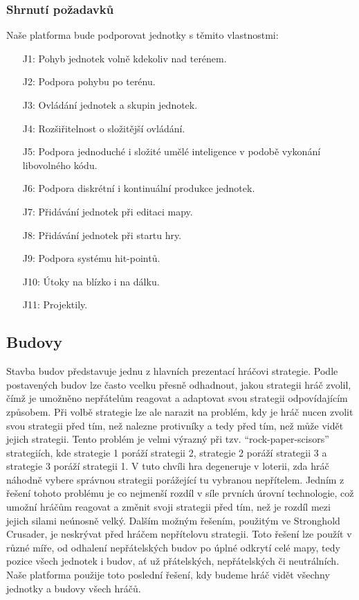 \subsubsection{Shrnutí požadavků}
Naše platforma bude podporovat jednotky s těmito vlastnostmi:
\begin{itemize}
	\item[J1:] Pohyb jednotek volně kdekoliv nad terénem.
	\item[J2:] Podpora pohybu po terénu.
	\item[J3:] Ovládání jednotek a skupin jednotek.
	\item[J4:] Rozšiřitelnost o složitější ovládání.
	\item[J5:] Podpora jednoduché i složité umělé inteligence v podobě vykonání libovolného kódu.
	\item[J6:] Podpora diskrétní i kontinuální produkce jednotek.
	\item[J7:] Přidávání jednotek při editaci mapy.
	\item[J8:] Přidávání jednotek při startu hry.
	\item[J9:] Podpora systému hit-pointů.
	\item[J10:] Útoky na blízko i na dálku.
	\item[J11:] Projektily.
\end{itemize}

\done
{}
\subsection{Budovy}
\label{sec:budovy}
Stavba budov představuje jednu z hlavních prezentací hráčovi strategie. Podle postavených budov lze často vcelku přesně odhadnout, jakou strategii hráč zvolil, čímž je umožněno nepřátelům reagovat a adaptovat svou strategii odpovídajícím způsobem. 
Při volbě strategie lze ale narazit na problém, kdy je hráč nucen zvolit svou strategii před tím, než nalezne protivníky a tedy před tím, než může vidět jejich strategii. Tento problém je velmi výrazný při tzv.  ``rock-paper-scisors'' strategiích, kde strategie 1 poráží strategii 2, strategie 2 poráží strategii 3 a strategie 3 poráží strategii 1. V tuto chvíli hra degeneruje v loterii, zda hráč náhodně vybere správnou strategii porážející tu vybranou nepřítelem.\citep{book:gamefund} Jedním z řešení tohoto problému je co nejmenší rozdíl v síle prvních úrovní technologie, což umožní hráčům reagovat a změnit svoji strategii před tím, než je rozdíl mezi jejich silami neúnosně velký. \citep{site:oxeye03} Dalším možným řešením, použitým ve Stronghold Crusader, je neskrývat před hráčem nepřítelovu strategii. Toto řešení lze použít v různé míře, od odhalení nepřátelských budov po úplné odkrytí celé mapy, tedy pozice všech jednotek i budov, ať už přátelských, nepřátelských či neutrálních. Naše platforma použije toto poslední řešení, kdy budeme hráč vidět všechny jednotky a budovy všech hráčů.


